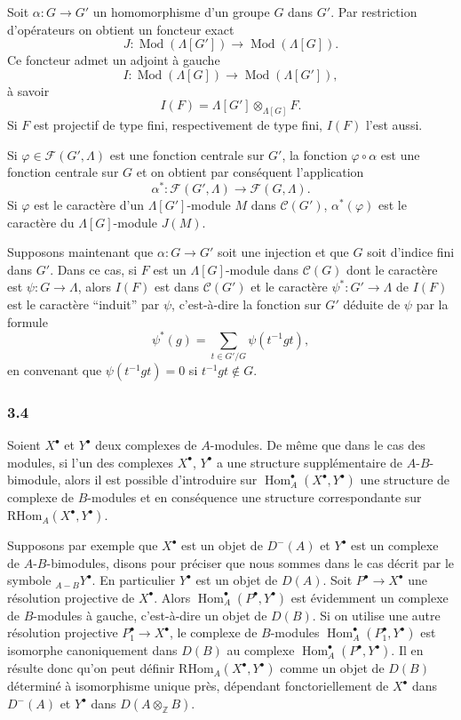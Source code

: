 \documentclass[11pt]{article}
\DeclareMathOperator{\Hom}{Hom}
\providecommand{\RHom}{\mathrm{RHom}}
\providecommand{\RHom}{\mathrm{RHom}}
\providecommand{\Hom}{\operatorname{Hom}}
\providecommand{\RHom}{\mathrm R\mathcal{H}om}
\providecommand{\Mod}{\operatorname{Mod}}
\providecommand{\RHom}{\mathrm{RHom}}
\providecommand{\Hom}{\operatorname{Hom}}
\begin{document}
Soit $\alpha:G\to G'$ un homomorphisme d'un groupe $G$ dans $G'$. Par restriction d'opérateurs on obtient un foncteur exact
\[
J:\Mod(\Lambda[G'])\longrightarrow\Mod(\Lambda[G]).
\]
Ce foncteur admet un adjoint à gauche
\[
I:\Mod(\Lambda[G])\longrightarrow\Mod(\Lambda[G']),
\]
à savoir
\[
I(F)=\Lambda[G']\otimes_{\Lambda[G]}F.
\]
Si $F$ est projectif de type fini, respectivement de type fini, $I(F)$ l'est aussi.

Si $\varphi\in\mathcal F(G',\Lambda)$ est une fonction centrale sur $G'$, la fonction $\varphi\circ\alpha$ est une fonction centrale sur $G$ et on obtient par conséquent l'application
\[
\alpha^*: \mathcal F(G',\Lambda)\longrightarrow\mathcal F(G,\Lambda).
\]
Si $\varphi$ est le caractère d'un $\Lambda[G']$-module $M$ dans $\mathcal C(G')$, $\alpha^*(\varphi)$ est le caractère du $\Lambda[G]$-module $J(M)$.

Supposons maintenant que $\alpha:G\to G'$ soit une injection et que $G$ soit d'indice fini dans $G'$. Dans ce cas, si $F$ est un $\Lambda[G]$-module dans $\mathcal C(G)$ dont le caractère est $\psi:G\to\Lambda$, alors $I(F)$ est dans $\mathcal C(G')$ et le caractère $\psi^*:G'\to\Lambda$ de $I(F)$ est le caractère ``induit'' par $\psi$, c'est-à-dire la fonction sur $G'$ déduite de $\psi$ par la formule
\[
\psi^*(g)=\sum_{t\in G'/G}\psi(t^{-1}gt),
\tag{3.3.1}
\]
en convenant que $\psi(t^{-1}gt)=0$ si $t^{-1}gt\notin G$.

\subsubsection*{3.4}

Soient $X^\bullet$ et $Y^\bullet$ deux complexes de $A$-modules. De même que dans le cas des modules, si l'un des complexes $X^\bullet$, $Y^\bullet$ a une structure supplémentaire de $A$-$B$-bimodule, alors il est possible d'introduire sur $\Hom_A^\bullet(X^\bullet,Y^\bullet)$ une structure de complexe de $B$-modules et en conséquence une structure correspondante sur $\RHom_A(X^\bullet,Y^\bullet)$.

Supposons par exemple que $X^\bullet$ est un objet de $D^-(A)$ et $Y^\bullet$ est un complexe de $A$-$B$-bimodules, disons pour préciser que nous sommes dans le cas décrit par le symbole ${}_{A-B}Y^\bullet$. En particulier $Y^\bullet$ est un objet de $D(A)$. Soit $P^\bullet\to X^\bullet$ une résolution projective de $X^\bullet$. Alors $\Hom_A^\bullet(P^\bullet,Y^\bullet)$ est évidemment un complexe de $B$-modules à gauche, c'est-à-dire un objet de $D(B)$. Si on utilise une autre résolution projective $P_1^\bullet\to X^\bullet$, le complexe de $B$-modules $\Hom_A^\bullet(P_1^\bullet,Y^\bullet)$ est isomorphe canoniquement dans $D(B)$ au complexe $\Hom_A^\bullet(P^\bullet,Y^\bullet)$. Il en résulte donc qu'on peut définir $\RHom_A(X^\bullet,Y^\bullet)$ comme un objet de $D(B)$ déterminé à isomorphisme unique près, dépendant fonctoriellement de $X^\bullet$ dans $D^-(A)$ et $Y^\bullet$ dans $D(A\otimes_{\mathbb Z}B)$.
\end{document}
